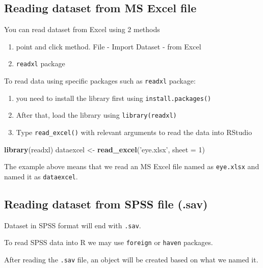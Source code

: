 \documentclass[]{book}
\newenvironment{Shaded}{\begin{snugshade}}{\end{snugshade}}
\newcommand{\KeywordTok}[1]{\textcolor[rgb]{0.13,0.29,0.53}{\textbf{#1}}}
\newcommand{\DataTypeTok}[1]{\textcolor[rgb]{0.13,0.29,0.53}{#1}}
\newcommand{\DecValTok}[1]{\textcolor[rgb]{0.00,0.00,0.81}{#1}}
\newcommand{\StringTok}[1]{\textcolor[rgb]{0.31,0.60,0.02}{#1}}
\newcommand{\NormalTok}[1]{#1}
\providecommand{\tightlist}{%
  \setlength{\itemsep}{0pt}\setlength{\parskip}{0pt}}
\theoremstyle{definition}
\theoremstyle{definition}
\theoremstyle{remark}
\begin{document}
\subsection{Reading dataset from MS Excel
file}\label{reading-dataset-from-ms-excel-file}

You can read dataset from Excel using 2 methods

\begin{enumerate}
\def\labelenumi{\arabic{enumi}.}
\tightlist
\item
  point and click method. File - Import Dataset - from Excel
\item
  \texttt{readxl} package
\end{enumerate}

To read data using specific packages such as \texttt{readxl} package:

\begin{enumerate}
\def\labelenumi{\arabic{enumi}.}
\tightlist
\item
  you need to install the library first using
  \texttt{install.packages()}
\item
  After that, load the library using \texttt{library(readxl)}
\item
  Type \texttt{read\_excel()} with relevant arguments to read the data
  into RStudio
\end{enumerate}

\begin{Shaded}
\begin{Highlighting}[]
\KeywordTok{library}\NormalTok{(readxl)}
\NormalTok{dataexcel <-}\StringTok{ }\KeywordTok{read_excel}\NormalTok{(}\StringTok{'eye.xlsx'}\NormalTok{, }\DataTypeTok{sheet =} \DecValTok{1}\NormalTok{)}
\end{Highlighting}
\end{Shaded}

The example above means that we read an MS Excel file named as
\texttt{eye.xlsx} and named it as \texttt{dataexcel}.

\subsection{Reading dataset from SPSS file
(.sav)}\label{reading-dataset-from-spss-file-.sav-1}

Dataset in SPSS format will end with \texttt{.sav}.

To read SPSS data into R we may use \texttt{foreign} or \texttt{haven}
packages.

After reading the \texttt{.sav} file, an object will be created based on
what we named it.
\end{document}
